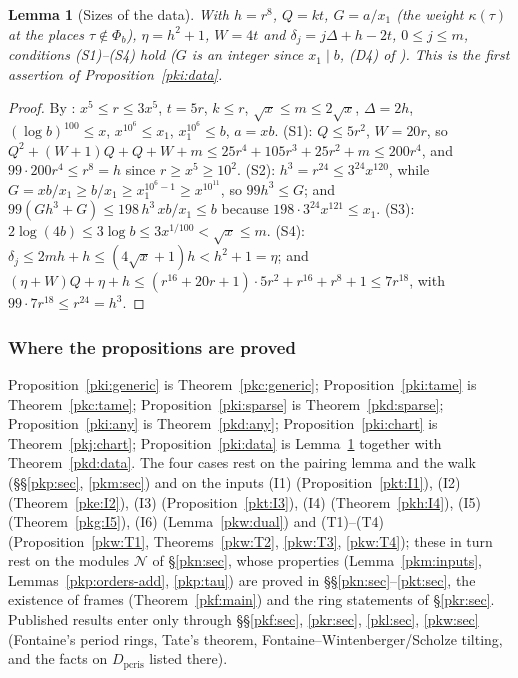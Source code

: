 \documentclass[10pt]{amsart}
\newtheorem{lemma}[theorem]{Lemma}
\theoremstyle{definition}
\theoremstyle{remark}
\providecommand{\auPb}{\Phi_b}
\begin{document}
\begin{lemma}[Sizes of the data]\label{pki:data-sizes}
With $h=r^8$, $Q=kt$, $G=a/x_1$ (the weight $\kappa(\tau)$ at the places $\tau\notin\auPb$),
$\eta=h^2+1$, $W=4t$ and $\delta_j=j\Delta+h-2t$, $0\le j\le m$, conditions (S1)--(S4) hold ($G$ is an integer since $x_1\mid b$, (D4) of {\cite[Definition~13.3]{P46}}). This is
the first assertion of Proposition~\ref{pki:data}.
\end{lemma}

\begin{proof}
By {\cite[(36)]{P46}}: $x^5\le r\le3x^5$, $t=5r$, $k\le r$, $\sqrt x\le m\le2\sqrt x$, $\Delta=2h$,
$(\log b)^{100}\le x$, $x^{10^6}\le x_1$, $x_1^{10^6}\le b$, $a=xb$. (S1): $Q\le5r^2$, $W=20r$, so
$Q^2+(W+1)Q+Q+W+m\le25r^4+105r^3+25r^2+m\le200r^4$, and $99\cdot200r^4\le r^8=h$ since
$r\ge x^5\ge 10^2$. (S2): $h^3=r^{24}\le3^{24}x^{120}$, while $G=xb/x_1\ge b/x_1\ge
x_1^{10^6-1}\ge x^{10^{11}}$, so $99h^3\le G$; and $99(Gh^3+G)\le 198\,h^3\,xb/x_1\le b$ because
$198\cdot3^{24}x^{121}\le x_1$. (S3): $2\log(4b)\le3\log b\le3x^{1/100}<\sqrt x\le m$. (S4):
$\delta_j\le2mh+h\le(4\sqrt x+1)h<h^2+1=\eta$; and $(\eta+W)Q+\eta+h\le(r^{16}+20r+1)\cdot5r^2+
r^{16}+r^8+1\le7r^{18}$, with $99\cdot7r^{18}\le r^{24}=h^3$.
\end{proof}

\subsubsection*{Where the propositions are proved}

Proposition~\ref{pki:generic} is Theorem~\ref{pkc:generic}; Proposition~\ref{pki:tame} is
Theorem~\ref{pkc:tame}; Proposition~\ref{pki:sparse} is Theorem~\ref{pkd:sparse};
Proposition~\ref{pki:any} is Theorem~\ref{pkd:any}; Proposition~\ref{pki:chart} is
Theorem~\ref{pkj:chart}; Proposition~\ref{pki:data} is Lemma~\ref{pki:data-sizes} together with
Theorem~\ref{pkd:data}. The four cases rest on the pairing lemma and the walk
(\S\S\ref{pkp:sec}, \ref{pkm:sec}) and on the inputs (I1) (Proposition~\ref{pkt:I1}), (I2)
(Theorem~\ref{pke:I2}), (I3) (Proposition~\ref{pkt:I3}), (I4) (Theorem~\ref{pkh:I4}), (I5)
(Theorem~\ref{pkg:I5}), (I6) (Lemma~\ref{pkw:dual}) and (T1)--(T4) (Proposition~\ref{pkw:T1},
Theorems~\ref{pkw:T2}, \ref{pkw:T3}, \ref{pkw:T4}); these in turn rest on the modules $\mathcal N$ of
\S\ref{pkn:sec}, whose properties (Lemma~\ref{pkm:inputs}, Lemmas~\ref{pkp:orders-add},
\ref{pkp:tau}) are proved in \S\S\ref{pkn:sec}--\ref{pkt:sec}, the existence of frames
(Theorem~\ref{pkf:main}) and the ring statements of \S\ref{pkr:sec}. Published results enter only
through \S\S\ref{pkf:sec}, \ref{pkr:sec}, \ref{pkl:sec}, \ref{pkw:sec} (Fontaine's period rings,
Tate's theorem, Fontaine--Wintenberger/Scholze tilting, and the facts on $D_{\mathrm{pcris}}$ listed
there).
\end{document}
